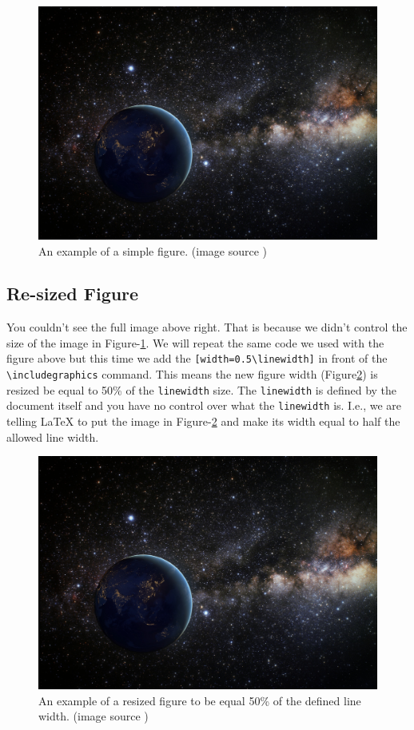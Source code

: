\begin{figure}[H]
    \begin{center}
        \includegraphics{figures/samples/earth-in-space.jpg}
        \caption{An example of a simple figure. (image source \cite{pdp:23})}
        \label{ref:simple-figure}
    \end{center}
\end{figure}


\subsection{Re-sized Figure}

You couldn't see the full image above right. That is because we didn't control the size of the image in Figure-\ref{ref:simple-figure}. We will repeat the same code we used with the figure above but this time we add the \verb|[width=0.5\linewidth]| in front of the \verb|\includegraphics| command. This means the new figure width (Figure\ref{ref:resized-figure}) is resized be equal to 50\% of the \verb|linewidth| size. The \verb|linewidth| is defined by the document itself and you have no control over what the \verb|linewidth| is. I.e., we are telling {\LaTeX} to put the image in Figure-\ref{ref:resized-figure} and make its width equal to half the allowed line width. 

\begin{figure}[H]
    \begin{center}
        \includegraphics[width=0.5\linewidth]{figures/samples/earth-in-space.jpg}
        \caption{An example of a resized figure to be equal 50\% of the defined line width. (image source \cite{pdp:23})}
        \label{ref:resized-figure}
    \end{center}
\end{figure}

